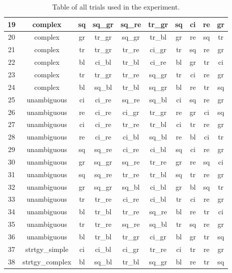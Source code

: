 \begin{table}[H]
{\begin{tabular}{|c|c|c|c|c|c|c|c|c|c|}
19 & complex & sq & sq\_gr & sq\_re & tr\_gr & sq & ci & re & gr \\ \hline
20 & complex & gr & tr\_gr & sq\_gr & tr\_bl & gr & re & sq & tr \\ \hline
21 & complex & tr & tr\_gr & tr\_re & ci\_gr & tr & sq & re & gr \\ \hline
22 & complex & bl & ci\_bl & tr\_bl & ci\_re & bl & gr & tr & ci \\ \hline
23 & complex & tr & tr\_gr & tr\_re & sq\_gr & tr & ci & re & gr \\ \hline
24 & complex & bl & sq\_bl & tr\_bl & sq\_gr & bl & re & tr & sq \\ \hline
25 & unambiguous & ci & ci\_re & sq\_re & sq\_bl & ci & sq & re & gr \\ \hline
26 & unambiguous & re & ci\_re & ci\_gr & tr\_gr & re & gr & ci & sq \\ \hline
27 & unambiguous & ci & ci\_re & tr\_re & tr\_bl & ci & tr & re & gr \\ \hline
28 & unambiguous & re & ci\_re & ci\_bl & sq\_bl & re & bl & ci & tr \\ \hline
29 & unambiguous & sq & sq\_re & ci\_re & ci\_bl & sq & ci & re & gr \\ \hline
30 & unambiguous & gr & sq\_gr & sq\_re & tr\_re & gr & re & sq & ci \\ \hline
31 & unambiguous & sq & sq\_re & tr\_re & tr\_bl & sq & tr & re & gr \\ \hline
32 & unambiguous & gr & sq\_gr & sq\_bl & ci\_bl & gr & bl & sq & tr \\ \hline
33 & unambiguous & tr & tr\_re & ci\_re & ci\_bl & tr & ci & re & gr \\ \hline
34 & unambiguous & bl & tr\_bl & tr\_re & sq\_re & bl & re & tr & ci \\ \hline
35 & unambiguous & tr & tr\_re & sq\_re & sq\_bl & tr & sq & re & gr \\ \hline
36 & unambiguous & bl & tr\_bl & tr\_gr & ci\_gr & bl & gr & tr & sq \\ \hline
37 & strtgy\_simple & ci & ci\_bl & ci\_gr & tr\_re & ci & tr & re & gr \\ \hline
38 & strtgy\_complex & bl & sq\_bl & tr\_bl & sq\_gr & bl & re & tr & sq \\ \hline
\end{tabular}%
}
\caption{Table of all trials used in the experiment. }
\label{tab:trials}
\end{table}